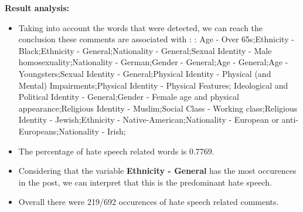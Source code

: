 \documentclass[11pt]{article}
\begin{document}
\textbf{\Large Result analysis:}

\begin{itemize}\item Taking into account the words that were detected, we can reach the conclusion these comments are associated with : : Age - Over 65s;Ethnicity - Black;Ethnicity - General;Nationality - General;Sexual Identity - Male homosexuality;Nationality - German;Gender - General;Age - General;Age - Youngsters;Sexual Identity - General;Physical Identity - Physical (and Mental) Impairments;Physical Identity - Physical Features; Ideological and Political Identity - General;Gender - Female age and physical appearance;Religious Identity - Muslim;Social Class - Working class;Religious Identity - Jewish;Ethnicity - Native-American;Nationality - European or anti-Europeans;Nationality - Irish;%

\item The percentage of hate speech related words is 0.7769.

\item Considering that the variable \textbf{Ethnicity - General} has the most occurences in the post, we can interpret that this is the predominant hate speech.

\item Overall there were 219/692 occurences of hate speech related comments.\end{itemize}
\end{document}

